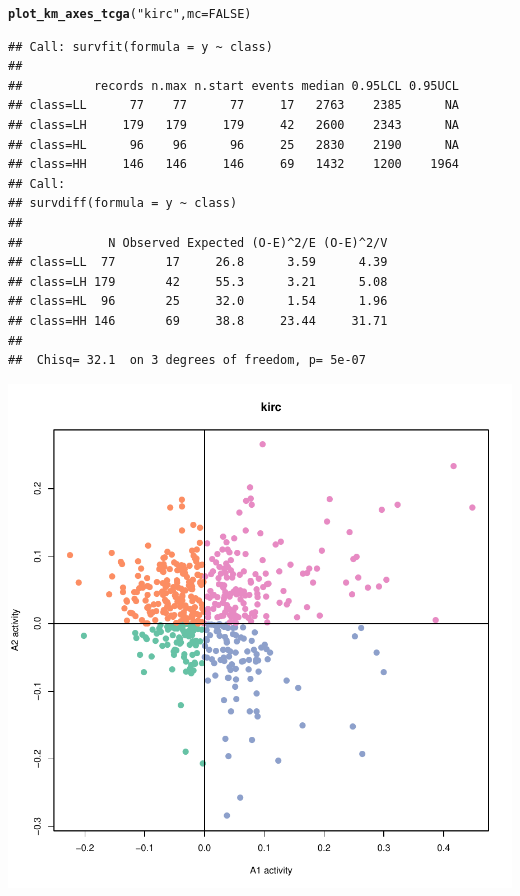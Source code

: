 \documentclass{article}\usepackage[]{graphicx}\usepackage[]{color}
\makeatletter
\def\maxwidth{ %
  \ifdim\Gin@nat@width>\linewidth
    \linewidth
  \else
    \Gin@nat@width
  \fi
}
\newcommand{\hlnum}[1]{\textcolor[rgb]{0.686,0.059,0.569}{#1}}%
\newcommand{\hlstr}[1]{\textcolor[rgb]{0.192,0.494,0.8}{#1}}%
\newcommand{\hlstd}[1]{\textcolor[rgb]{0.345,0.345,0.345}{#1}}%
\newcommand{\hlkwc}[1]{\textcolor[rgb]{0.333,0.667,0.333}{#1}}%
\newcommand{\hlkwd}[1]{\textcolor[rgb]{0.737,0.353,0.396}{\textbf{#1}}}%
\newenvironment{kframe}{%
 \def\at@end@of@kframe{}%
 \ifinner\ifhmode%
  \def\at@end@of@kframe{\end{minipage}}%
  \begin{minipage}{\columnwidth}%
 \fi\fi%
 \def\FrameCommand##1{\hskip\@totalleftmargin \hskip-\fboxsep
 \colorbox{shadecolor}{##1}\hskip-\fboxsep
     \hskip-\linewidth \hskip-\@totalleftmargin \hskip\columnwidth}%
 \MakeFramed {\advance\hsize-\width
   \@totalleftmargin\z@ \linewidth\hsize
   \@setminipage}}%
 {\par\unskip\endMakeFramed%
 \at@end@of@kframe}
\newenvironment{knitrout}{}{} %
\makeatother
\begin{document}
\begin{knitrout}
{}


\begin{kframe}\begin{alltt}
\hlkwd{plot_km_axes_tcga}\hlstd{(}\hlstr{"kirc"}\hlstd{,} \hlkwc{mc} \hlstd{=} \hlnum{FALSE}\hlstd{)}
\end{alltt}
\begin{verbatim}
## Call: survfit(formula = y ~ class)
## 
##          records n.max n.start events median 0.95LCL 0.95UCL
## class=LL      77    77      77     17   2763    2385      NA
## class=LH     179   179     179     42   2600    2343      NA
## class=HL      96    96      96     25   2830    2190      NA
## class=HH     146   146     146     69   1432    1200    1964
## Call:
## survdiff(formula = y ~ class)
## 
##            N Observed Expected (O-E)^2/E (O-E)^2/V
## class=LL  77       17     26.8      3.59      4.39
## class=LH 179       42     55.3      3.21      5.08
## class=HL  96       25     32.0      1.54      1.96
## class=HH 146       69     38.8     23.44     31.71
## 
##  Chisq= 32.1  on 3 degrees of freedom, p= 5e-07
\end{verbatim}
\end{kframe}

{\centering \includegraphics[width=\maxwidth]{figure/km-curves-9} 

}





\end{knitrout}
\end{document}
